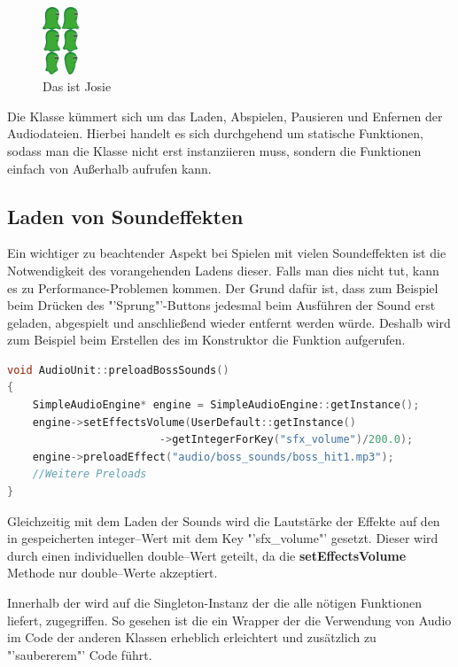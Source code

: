 \begin{figure}[H]
  \includegraphics[width=0.1\textwidth]{resources/josiejump}
  \caption{Das ist Josie}
  \label{fig:josie} 
\end{figure}

\label{sec:4_Audiounit}
Die Klasse  kümmert sich um das Laden, Abspielen, Pausieren und Enfernen der Audiodateien. Hierbei handelt es sich durchgehend um statische Funktionen, sodass man die Klasse nicht erst instanziieren muss, sondern die Funktionen einfach von Außerhalb aufrufen kann.

\subsection{Laden von Soundeffekten}
Ein wichtiger zu beachtender Aspekt bei Spielen mit vielen Soundeffekten ist die Notwendigkeit des vorangehenden Ladens dieser. Falls man dies nicht tut, kann es zu Performance-Problemen kommen. Der Grund dafür ist, dass zum Beispiel beim Drücken des "'Sprung"'-Buttons jedesmal beim Ausführen der Sound erst geladen, abgespielt und anschließend wieder entfernt werden würde. Deshalb wird zum Beispiel beim Erstellen des  im Konstruktor die Funktion  aufgerufen.

\begin{lstlisting}[label=lst:preloadBossSounds,
				   language=C++,
				   firstnumber=30,
				   caption=BossLevel-Sounds laden ( AudioUnit.cpp )]
void AudioUnit::preloadBossSounds()
{
	SimpleAudioEngine* engine = SimpleAudioEngine::getInstance();
	engine->setEffectsVolume(UserDefault::getInstance()
						->getIntegerForKey("sfx_volume")/200.0);
	engine->preloadEffect("audio/boss_sounds/boss_hit1.mp3");
	//Weitere Preloads
}
\end{lstlisting}

Gleichzeitig mit dem Laden der Sounds wird die Lautstärke der Effekte auf den in  gespeicherten integer--Wert mit dem Key "'sfx\_volume"' gesetzt. Dieser wird durch einen individuellen double--Wert geteilt, da die \textbf{setEffectsVolume} Methode nur double--Werte akzeptiert.

Innerhalb der  wird auf die Singleton-Instanz der  die alle nötigen Funktionen liefert, zugegriffen. So gesehen ist die  ein Wrapper der die Verwendung von Audio im Code der anderen Klassen erheblich erleichtert und zusätzlich zu "'saubererem"' Code führt. 

